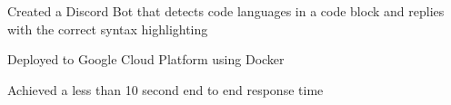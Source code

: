\documentclass[]{resume-template}
\begin{document}
\begin{minipage}[t]{0.66\textwidth}
\begin{tightemize}
        \end{tightemize}
        \vspace{\topsep}

        \label{subsec:neatbot}
        \begin{tightemize}
            \item Created a Discord Bot that detects code languages in a code block and replies with the correct syntax highlighting
            \item Deployed to Google Cloud Platform using Docker
            \item Achieved a less than 10 second end to end response time
        \end{tightemize}




        \sectionsep{}




\end{minipage}
\end{document}
